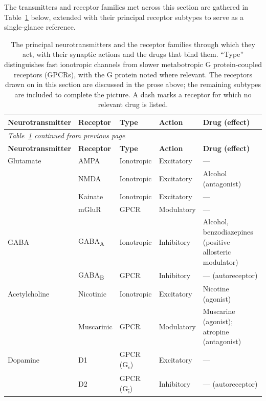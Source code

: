\documentclass[11pt]{article}
\begin{document}
The transmitters and receptor families met across this section are gathered in Table~\ref{tab:transmitters} below, extended with their principal receptor subtypes to serve as a single-glance reference.

{\footnotesize
\renewcommand{\arraystretch}{1.3}
\begin{longtable}{p{2.8cm} p{2.4cm} p{1.8cm} p{1.9cm} p{4.0cm}}
\caption{The principal neurotransmitters and the receptor families through which they act, with their synaptic actions and the drugs that bind them. ``Type'' distinguishes fast ionotropic channels from slower metabotropic G protein-coupled receptors (GPCRs), with the G protein noted where relevant. The receptors drawn on in this section are discussed in the prose above; the remaining subtypes are included to complete the picture. A dash marks a receptor for which no relevant drug is listed.}
\label{tab:transmitters} \\
\toprule
\textbf{Neurotransmitter} & \textbf{Receptor} & \textbf{Type} & \textbf{Action} & \textbf{Drug (effect)} \\
\midrule
\endfirsthead
\multicolumn{5}{l}{\emph{\small Table~\ref{tab:transmitters} continued from previous page}} \\
\toprule
\textbf{Neurotransmitter} & \textbf{Receptor} & \textbf{Type} & \textbf{Action} & \textbf{Drug (effect)} \\
\midrule
\endhead
\bottomrule
\endfoot
\bottomrule
\endlastfoot
Glutamate & AMPA & Ionotropic & Excitatory & --- \\
 & NMDA & Ionotropic & Excitatory & Alcohol (antagonist) \\
 & Kainate & Ionotropic & Excitatory & --- \\
 & mGluR & GPCR & Modulatory & --- \\
\midrule
GABA & GABA\textsubscript{A} & Ionotropic & Inhibitory & Alcohol, benzodiazepines (positive allosteric modulator) \\
 & GABA\textsubscript{B} & GPCR & Inhibitory & --- (autoreceptor) \\
\midrule
Acetylcholine & Nicotinic & Ionotropic & Excitatory & Nicotine (agonist) \\
 & Muscarinic & GPCR & Modulatory & Muscarine (agonist); atropine (antagonist) \\
\midrule
Dopamine & D1 & GPCR (G\textsubscript{s}) & Excitatory & --- \\
 & D2 & GPCR (G\textsubscript{i}) & Inhibitory & --- (autoreceptor) \\
\midrule

\end{longtable}}
\end{document}
